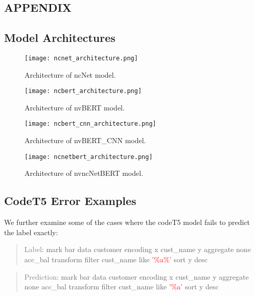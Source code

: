 \documentclass[
	a4paper, %
	10pt, %
	unnumberedsections, %
	twoside, %
]{t0003}
\newcommand{\gray}[1]{\textcolor{gray}{#1}}
\newcommand{\red}[1]{\textcolor{red}{#1}}
\begin{document}
\clearpage
\begin{appendices}

\section*{APPENDIX}

\subsection{Model Architectures}

\begin{figure}[H]
	\texttt{[image: ncnet\_architecture.png]}
	\caption{Architecture of ncNet model.}
	\label{fig:ncnet}
\end{figure}

\begin{figure}[H]
	\texttt{[image: ncbert\_architecture.png]}
	\caption{Architecture of nvBERT model.}
	\label{fig:ncbert}
\end{figure}

\begin{figure}[H]
	\texttt{[image: ncbert\_cnn\_architecture.png]}
	\caption{Architecture of nvBERT\_CNN model.}
	\label{fig:ncbertcnn}
\end{figure}

\begin{figure}[H]
	\texttt{[image: ncnetbert\_architecture.png]}
	\caption{Architecture of nvncNetBERT model.}
	\label{fig:ncnetbert}
\end{figure}

\subsection{CodeT5 Error Examples}

We further examine some of the cases where the codeT5 model fails to predict the label exactly:

\begin{quote}
\gray{Label}: mark bar data customer encoding x cust\_name y aggregate none acc\_bal transform filter cust\_name like \red{'\%a\%'} sort y desc
\end{quote}

\begin{quote}
\gray{Prediction}: mark bar data customer encoding x cust\_name y aggregate none acc\_bal transform filter cust\_name like \red{'\%a'} sort y desc
\end{quote}


\end{appendices}
\end{document}
